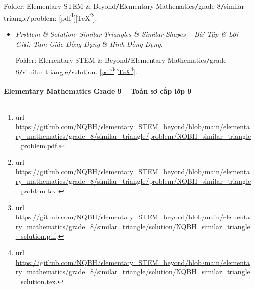 \documentclass[12pt]{article}
\begin{document}
\begin{itemize}
	Folder: {\sf Elementary STEM \& Beyond{\tt/}Elementary Mathematics{\tt/}grade 8{\tt/}similar triangle{\tt/}problem}: [\href{https://github.com/NQBH/elementary_STEM_beyond/blob/main/elementary_mathematics/grade_8/similar_triangle/problem/NQBH_similar_triangle_problem.pdf}{pdf}\footnote{{\sc url}: \url{https://github.com/NQBH/elementary_STEM_beyond/blob/main/elementary_mathematics/grade_8/similar_triangle/problem/NQBH_similar_triangle_problem.pdf}.}][\href{https://github.com/NQBH/elementary_STEM_beyond/blob/main/elementary_mathematics/grade_8/similar_triangle/problem/NQBH_similar_triangle_problem.tex}{\TeX}\footnote{{\sc url}: \url{https://github.com/NQBH/elementary_STEM_beyond/blob/main/elementary_mathematics/grade_8/similar_triangle/problem/NQBH_similar_triangle_problem.tex}.}].
	\begin{itemize}
		\item {\it Problem \& Solution: Similar Triangles \& Similar Shapes -- Bài Tập \& Lời Giải: Tam Giác Đồng Dạng \& Hình Đồng Dạng}.
		
		Folder: {\sf Elementary STEM \& Beyond{\tt/}Elementary Mathematics{\tt/}grade 8{\tt/}similar triangle{\tt/}solution}: [\href{https://github.com/NQBH/elementary_STEM_beyond/blob/main/elementary_mathematics/grade_8/similar_triangle/solution/NQBH_similar_triangle_solution.pdf}{pdf}\footnote{{\sc url}: \url{https://github.com/NQBH/elementary_STEM_beyond/blob/main/elementary_mathematics/grade_8/similar_triangle/solution/NQBH_similar_triangle_solution.pdf}.}][\href{https://github.com/NQBH/elementary_STEM_beyond/blob/main/elementary_mathematics/grade_8/similar_triangle/solution/NQBH_similar_triangle_solution.tex}{\TeX}\footnote{{\sc url}: \url{https://github.com/NQBH/elementary_STEM_beyond/blob/main/elementary_mathematics/grade_8/similar_triangle/solution/NQBH_similar_triangle_solution.tex}.}].
	\end{itemize}
\end{itemize}

\paragraph{Elementary Mathematics Grade 9 -- Toán sơ cấp lớp 9}
\end{document}
